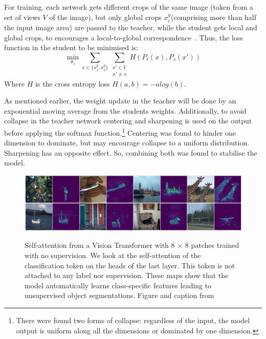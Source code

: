 For training, each network gets different crops of the same image (taken from a set of views $V$ of the image), but only global crops $x^g_i$(comprising more than half the input image area) are passed to the teacher, while the student gets local and global crops, to encourages a local-to-global correspondence~\autocite{Caron2021}.
Thus, the loss function in the student to be minimised is:
\begin{equation}
    \min_{\theta_s} \sum_{x \in \{x^g_1, x^g_2\}} \sum_{\substack{x' \in V \\ x' \neq x}} H(P_t(x), P_s(x'))
    \label{eq:loss-with-crops}
\end{equation}
Where $H$ is the cross entropy loss $H(a,b) = -a log(b)$.

As mentioned earlier, the weight update in the teacher will be done by an exponential moving average from the students weights.
Additionally, to avoid collapse in the teacher network centering and sharpening is used on the output before applying the softmax function.\footnote{There were found two forms of collapse: regardless of the input, the model output is uniform along all the dimensions or dominated by one dimension.}
Centering was found to hinder one dimension to dominate, but may encourage collapse to a uniform distribution.
Sharpening has an opposite effect.
So, combining both was found to stabilise the model.~\autocite{Caron2021}

\begin{figure}[!t]
    \centering
    \includegraphics[width=\textwidth]{pictures/dino-attentionmaps}\\
    \caption[Self-attention maps of DINO]{Self-attention from a Vision Transformer with 8 × 8 patches trained with no supervision. We look at the self-attention of the classification token on the heads of the last layer. This token is not attached to any label nor supervision. These maps show that the model automatically learns class-specific features leading to unsupervised object segmentations. Figure and caption from~\autocite{Caron2021}}
    \label{fig:dino-attentionmaps}
\end{figure}

